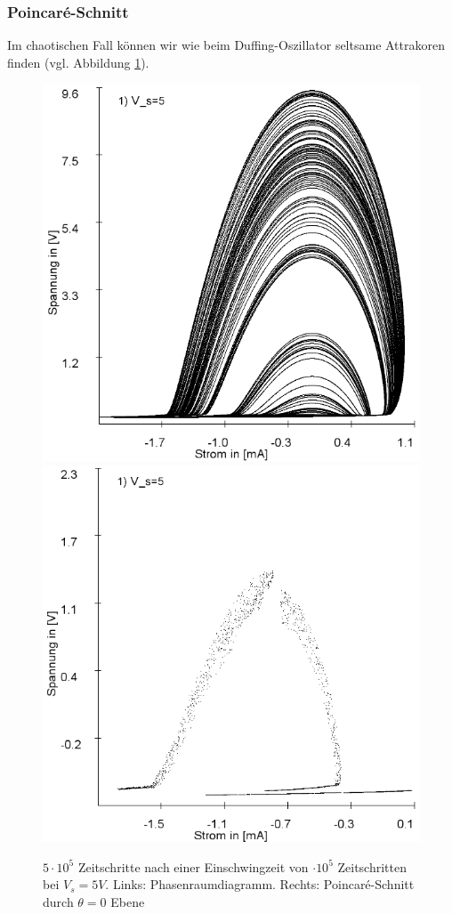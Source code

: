 \documentclass[12pt,a4paper]{article}
\begin{document}
\subsubsection{Poincaré-Schnitt}
 Im chaotischen Fall können wir wie beim Duffing-Oszillator seltsame Attrakoren finden (vgl. Abbildung \ref{fig:ldr-poin1}).
\begin{figure}[!htbp]
\includegraphics[scale=0.4]{schwing-v5-euler}
\includegraphics[scale=0.4]{schwing-v5-euler-poincare}
\caption{$5\cdot10^5$ Zeitschritte nach einer Einschwingzeit von $\cdot10^5$ Zeitschritten bei $V_s=5V$. Links: Phasenraumdiagramm. Rechts: Poincaré-Schnitt durch $\theta=0$ Ebene}
\label{fig:ldr-poin1}
\end{figure}
\end{document}
